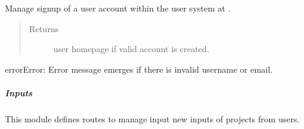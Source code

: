 \documentclass[a4paper,12pt,english]{sphinxmanual}
\begin{document}

\begin{fulllineitems}
\label{\detokenize{project_rst/user_rst/routes:project.user.account.signup}}
Manage signup of a user account within the user system at .
\begin{quote}\begin{description}
\item[{Returns}] \leavevmode
user homepage if valid account is created.

\end{description}\end{quote}

\begin{sphinxadmonition}{error}{Error:}
Error message emerges if there is invalid username or email.
\end{sphinxadmonition}

\end{fulllineitems}

\label{\detokenize{project_rst/user_rst/routes:module-project.user.inputs}}

\subparagraph{Inputs}
\label{\detokenize{project_rst/user_rst/routes:inputs}}
 

This module defines routes to manage input new inputs of projects from users.
\end{document}
